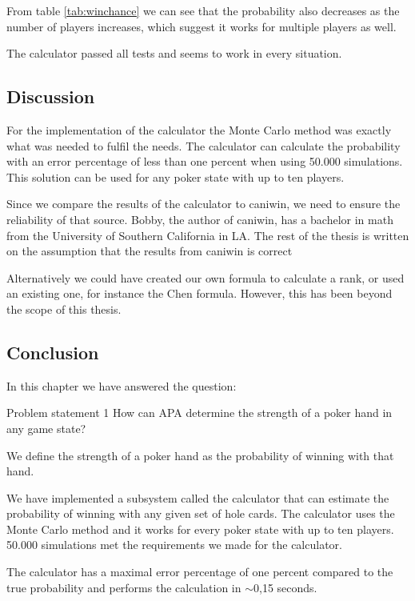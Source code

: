 From table \ref{tab:winchance} we can see that the probability also decreases as the number of players increases, which suggest it works for multiple players as well.

The calculator passed all tests and seems to work in every situation. 

\subsection{Discussion}
For the implementation of the calculator the Monte Carlo method was exactly what was needed to fulfil the needs. The calculator can calculate the probability with an error percentage of less than one percent when using 50.000 simulations. This solution can be used for any poker state with up to ten players.	

Since we compare the results of the calculator to caniwin, we need to ensure the reliability of that source. Bobby, the author of caniwin, has a bachelor in math from the University of Southern California in LA. The rest of the thesis is written on the assumption that the results from caniwin is correct

Alternatively we could have created our own formula to calculate a rank, or used an existing one, for instance the Chen formula. However, this has been beyond the scope of this thesis.

\subsection{Conclusion}
In this chapter we have answered the question:
\vspace{4mm}
\begin{statementBox2}{Problem statement 1}
How can APA determine the strength of a poker hand in any game state?
\end{statementBox2}
\vspace{4mm}

We define the strength of a poker hand as the probability of winning with that hand.

We have implemented a subsystem called the calculator that can estimate the probability of winning with any given set of hole cards. The calculator uses the Monte Carlo method and it works for every poker state with up to ten players. 50.000 simulations  met the requirements we made for the calculator.   

The calculator has a maximal error percentage of one percent compared to the true probability and performs the calculation in $\sim$0,15 seconds.
